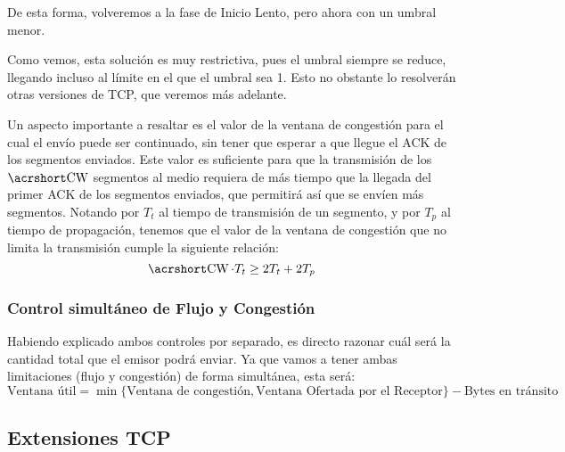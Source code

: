 \begin{description}
    De esta forma, volveremos a la fase de Inicio Lento, pero ahora con un umbral menor.
    \begin{observacion}
        Como vemos, esta solución es muy restrictiva, pues el umbral siempre se reduce, llegando incluso al límite en el que el umbral sea 1. Esto no obstante lo resolverán otras versiones de \acrshort{TCP}, que veremos más adelante.
    \end{observacion}
\end{description}

Un aspecto importante a resaltar es el valor de la ventana de congestión para el cual el envío puede ser continuado, sin tener que esperar a que llegue el \acrshort{ACK} de los segmentos enviados. Este valor es suficiente para que la transmisión de los $\cw$ segmentos al medio requiera de más tiempo que la llegada del primer \acrshort{ACK} de los segmentos enviados, que permitirá así que se envíen más segmentos. Notando por $T_t$ al tiempo de transmisión de un segmento, y por $T_p$ al tiempo de propagación, tenemos que el valor de la ventana de congestión que no limita la transmisión cumple la siguiente relación:
\begin{equation*}
    \cw \cdot T_t \geq 2T_t + 2T_p
\end{equation*}

\subsubsection{Control simultáneo de Flujo y Congestión}
    Habiendo explicado ambos controles por separado, es directo razonar cuál será la cantidad total que el emisor podrá enviar. Ya que vamos a tener ambas limitaciones (flujo y congestión) de forma simultánea, esta será:
    \begin{equation*}
        \text{Ventana útil} = \min\{\text{Ventana de congestión}, \text{Ventana Ofertada por el Receptor}\} - \text{Bytes en tránsito}
    \end{equation*}

\subsection{Extensiones \acrshort{TCP}}

